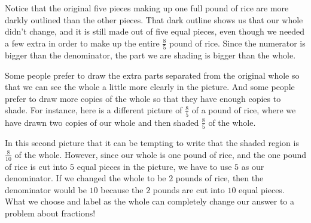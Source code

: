 \documentclass{ximera}
\begin{document}
\begin{example}
\begin{image} \end{image}

Notice that the original five pieces making up one full pound of rice are more darkly outlined than the other pieces. That dark outline shows us that our whole didn't change, and it is still made out of five equal pieces, even though we needed a few extra in order to make up the entire $\frac{8}{5}$ pound of rice. Since the numerator is bigger than the denominator, the part we are shading is bigger than the whole.

Some people prefer to draw the extra parts separated from the original whole so that we can see the whole a little more clearly in the picture. And some people prefer to draw more copies of the whole so that they have enough copies to shade. For instance, here is a different picture of $\frac{8}{5}$ of a pound of rice, where we have drawn two copies of our whole and then shaded $\frac{8}{5}$ of the whole.

\begin{image} \end{image}

In this second picture that it can be tempting to write that the shaded region is $\frac{8}{10}$ of the whole. However, since our whole is one pound of rice, and the one pound of rice is cut into $5$ equal pieces in the picture, we have to use $5$ as our denominator. If we changed the whole to be $2$ pounds of rice, then the denominator would be $10$ because the $2$ pounds are cut into $10$ equal pieces. What we choose and label as the whole can completely change our answer to a problem about fractions!

\end{example}
\end{document}
